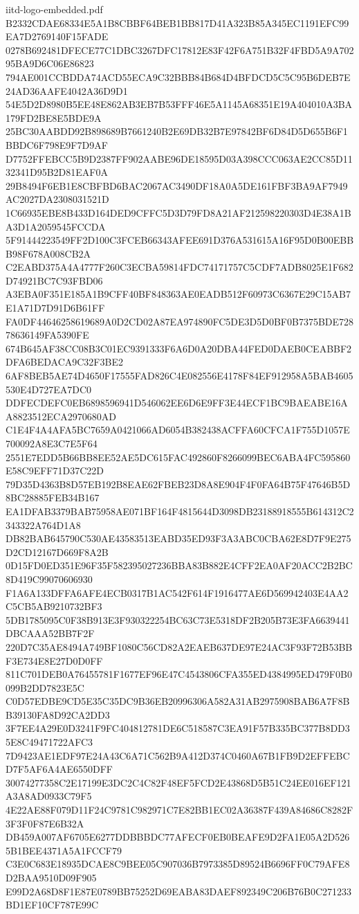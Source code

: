 \begin{filecontents*}[overwrite]{iitd-logo-embedded.pdf}
B2332CDAE68334E5A1B8CBBF64BEB1BB817D41A323B85A345EC1191EFC99EA7D2769140F15FADE
0278B692481DFECE77C1DBC3267DFC17812E83F42F6A751B32F4FBD5A9A70295BA9D6C06E86823
794AE001CCBDDA74ACD55ECA9C32BBB84B684D4BFDCD5C5C95B6DEB7E24AD36AAFE4042A36D9D1
54E5D2D8980B5EE48E862AB3EB7B53FFF46E5A1145A68351E19A404010A3BA179FD2BE8E5BDE9A
25BC30AABDD92B898689B7661240B2E69DB32B7E97842BF6D84D5D655B6F1BBDC6F798E9F7D9AF
D7752FFEBCC5B9D2387FF902AABE96DE18595D03A398CCC063AE2CC85D1132341D95B2D81EAF0A
29B8494F6EB1E8CBFBD6BAC2067AC3490DF18A0A5DE161FBF3BA9AF7949AC2027DA2308031521D
1C66935EBE8B433D164DED9CFFC5D3D79FD8A21AF212598220303D4E38A1BA3D1A2059545FCCDA
5F91444223549FF2D100C3FCEB66343AFEE691D376A531615A16F95D0B00EBBB98F678A008CB2A
C2EABD375A4A4777F260C3ECBA59814FDC74171757C5CDF7ADB8025E1F682D74921BC7C93FBD06
A3EBA0F351E185A1B9CFF40BF848363AE0EADB512F60973C6367E29C15AB7E1A71D7D91D6B61FF
FA0DF44646258619689A0D2CD02A87EA974890FC5DE3D5D0BF0B7375BDE72878636149FA5390FE
674B645AF38CC08B3C01EC9391333F6A6D0A20DBA44FED0DAEB0CEABBF2DFA6BEDACA9C32F3BE2
6AF8BEB5AE74D4650F17555FAD826C4E082556E4178F84EF912958A5BAB4605530E4D727EA7DC0
DDFECDEFC0EB6898596941D546062EE6D6E9FF3E44ECF1BC9BAEABE16AA8823512ECA2970680AD
C1E4F4A4AFA5BC7659A0421066AD6054B382438ACFFA60CFCA1F755D1057E700092A8E3C7E5F64
2551E7EDD5B66BB8EE52AE5DC615FAC492860F8266099BEC6ABA4FC595860E58C9EFF71D37C22D
79D35D4363B8D57EB192B8EAE62FBEB23D8A8E904F4F0FA64B75F47646B5D8BC28885FEB34B167
EA1DFAB3379BAB75958AE071BF164F4815644D3098DB23188918555B614312C2343322A764D1A8
DB82BAB645790C530AE43583513EABD35ED93F3A3ABC0CBA62E8D7F9E275D2CD12167D669F8A2B
0D15FD0ED351E96F35F582395027236BBA83B882E4CFF2EA0AF20ACC2B2BC8D419C99070606930
F1A6A133DFFA6AFE4ECB0317B1AC542F614F1916477AE6D569942403E4AA2C5CB5AB9210732BF3
5DB1785095C0F38B913E3F930322254BC63C73E5318DF2B205B73E3FA6639441DBCAAA52BB7F2F
220D7C35AE8494A749BF1080C56CD82A2EAEB637DE97E24AC3F93F72B53BBF3E734E8E27D0D0FF
811C701DEB0A76455781F1677EF96E47C4543806CFA355ED4384995ED479F0B0099B2DD7823E5C
C0D57EDBE9CD5E35C35DC9B36EB20996306A582A31AB2975908BAB6A7F8BB39130FA8D92CA2DD3
3F7EE4A29E0D3241F9FC404812781DE6C518587C3EA91F57B335BC377B8DD35E8C49471722AFC3
7D9423AE1EDF97E24A43C6A71C562B9A412D374C0460A67B1FB9D2EFFEBCD7F5AF6A4AE6550DFF
30074277358C2E17199E3DC2C4C82F48EF5FCD2E43868D5B51C24EE016EF121A3A8AD0933C79F5
4E22AE88F079D11F24C9781C982971C7E82BB1EC02A36387F439A84686C8282F3F3F0F87E6B32A
DB459A007AF6705E6277DDBBBDC77AFECF0EB0BEAFE9D2FA1E05A2D5265B1BEE4371A5A1FCCF79
C3E0C683E18935DCAE8C9BEE05C907036B7973385D89524B6696FF0C79AFE8D2BAA9510D09F905
E99D2A68D8F1E87E0789BB75252D69EABA83DAEF892349C206B76B0C271233BD1EF10CF787E99C

\end{filecontents*}
